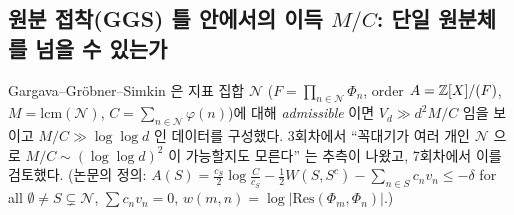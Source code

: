 \subsection{원분 접착(GGS) 틀 안에서의 이득 $M/C$: 단일 원분체를 넘을 수 있는가}\label{sec:gluing}

Gargava--Gr\"obner--Simkin 은 지표 집합 $\mathcal N$ ($F=\prod_{n\in\mathcal N}\Phi_n$, order $A=\mathbb{Z}[X]/(F)$, $M=\mathrm{lcm}(\mathcal N)$, $C=\sum_{n\in\mathcal N}\varphi(n)$)에 대해 \emph{admissible} 이면 $V_d\gg d^2M/C$ 임을 보이고 $M/C\gg\log\log d$ 인 데이터를 구성했다. 3회차에서 ``꼭대기가 여러 개인 $\mathcal N$ 으로 $M/C\sim(\log\log d)^2$ 이 가능할지도 모른다'' 는 추측이 나왔고, 7회차에서 이를 검토했다. (논문의 정의: $A(S)=\tfrac{c_S}2\log\tfrac C{c_S}-\tfrac12W(S,S^c)-\sum_{n\in S}c_nv_n\le-\delta$ for all $\emptyset\ne S\subsetneq\mathcal N$, $\sum c_nv_n=0$, $w(m,n)=\log|\mathrm{Res}(\Phi_m,\Phi_n)|$.)

